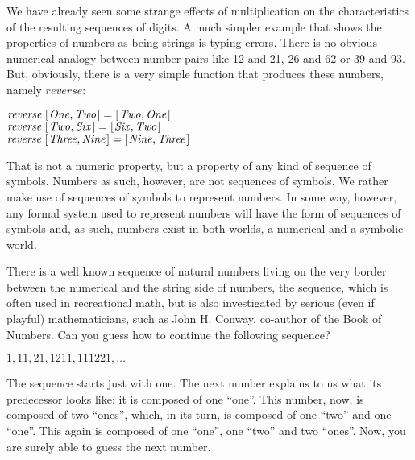 \documentclass{scrreprt}
\newcommand{\Conid}[1]{\mathit{#1}}
\newcommand{\Varid}[1]{\mathit{#1}}
\begin{document}
We have already seen some strange effects
of multiplication on the characteristics
of the resulting sequences of digits.
A much simpler example 
that shows the properties of numbers
as being strings is typing errors.
There is no obvious numerical analogy
between number pairs like
12 and 21, 
26 and 62 or
39 and 93.
But, obviously, there is a very simple
function that produces these numbers, namely \ensuremath{\Varid{reverse}}:

\ensuremath{\Varid{reverse}\;[\mskip1.5mu \Conid{One},\Conid{Two}\mskip1.5mu]\mathrel{=}[\mskip1.5mu \Conid{Two},\Conid{One}\mskip1.5mu]}\\
\ensuremath{\Varid{reverse}\;[\mskip1.5mu \Conid{Two},\Conid{Six}\mskip1.5mu]\mathrel{=}[\mskip1.5mu \Conid{Six},\Conid{Two}\mskip1.5mu]}\\
\ensuremath{\Varid{reverse}\;[\mskip1.5mu \Conid{Three},\Conid{Nine}\mskip1.5mu]\mathrel{=}[\mskip1.5mu \Conid{Nine},\Conid{Three}\mskip1.5mu]}

That is not a numeric property,
but a property of any kind of sequence of symbols.
Numbers as such, however, are not sequences of symbols.
We rather make use of sequences of symbols to represent numbers.
In some way, however, any formal system
used to represent numbers will have the form
of sequences of symbols and, as such,
numbers exist in both worlds, a  numerical and
a symbolic world.

There is a well known sequence of natural numbers
living on the very border between the numerical
and the string side of numbers,
the  sequence, which is often
used in recreational math, but is also investigated
by serious (even if playful) mathematicians, such as
John H. Conway, co-author of the Book of Numbers.
Can you guess how to continue the following sequence?

$1, 11, 21, 1211, 111221, \dots$

The sequence starts just with one.
The next number explains to us what its predecessor looks like:
it is composed of one ``one''.
This number, now, is composed of two ``ones'', which,
in its turn, is composed of one ``two'' and one ``one''.
This again is composed of one ``one'', one ``two'' and
two ``ones''.
Now, you are surely able to guess the next number.
\end{document}
